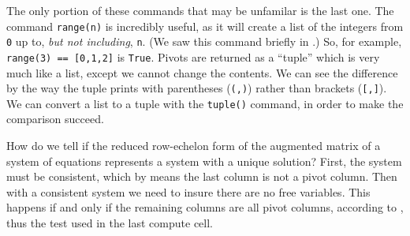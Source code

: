 %
The only portion of these commands that may be unfamilar is the last one.  The command \verb?range(n)? is incredibly useful, as it will create a list of the integers from \verb?0? up to, \emph{but not including}, \verb?n?.  (We saw this command briefly in .)  So, for example, \texttt{range(3) == [0,1,2]} is \verb?True?.  Pivots are returned as a ``tuple'' which is very much like a list, except we cannot change the contents.  We can see the difference by the way the tuple prints with parentheses (\verb?(,)?) rather than brackets (\verb?[,]?).  We can convert a list to a tuple with the \verb?tuple()? command, in order to make the comparison succeed.\par
%
How do we tell if the reduced row-echelon form of the augmented matrix of a system of equations represents a system with a unique solution?  First, the system must be consistent, which by  means the last column is not a pivot column.  Then with a consistent system we need to insure there are no free variables.  This happens if and only if the remaining columns are all pivot columns, according to , thus the test used in the last compute cell.
%
\begin{sageverbatim}
\end{sageverbatim}
%
